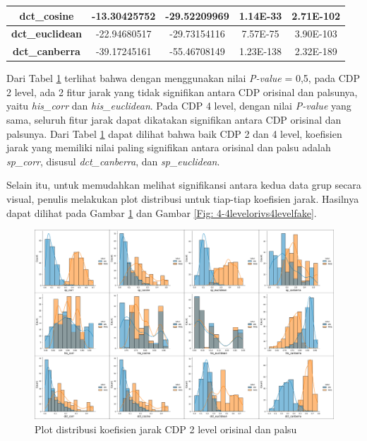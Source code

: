 \begin{table}[!ht]
\begin{tabular}{|c|cc|cc|}
		\textbf{dct\_cosine}    & \multicolumn{1}{c|}{-13.30425752}         & -29.52209969                          & \multicolumn{1}{c|}{1.14E-33}         & 2.71E-102        \\ \hline
		\textbf{dct\_euclidean} & \multicolumn{1}{c|}{-22.94680517}         & -29.73154116                          & \multicolumn{1}{c|}{7.57E-75}         & 3.90E-103        \\ \hline
		\textbf{dct\_canberra}  & \multicolumn{1}{c|}{-39.17245161}         & -55.46708149                          & \multicolumn{1}{c|}{1.23E-138}        & 2.32E-189        \\ \hline
	\end{tabular}
	\label{Tab: 4-hasilujisignifikansiorivspalsu}
\end{table}

Dari Tabel \ref{Tab: 4-hasilujisignifikansiorivspalsu} terlihat bahwa dengan menggunakan nilai \emph{P-value} =  0,5, pada CDP 2 level, ada 2 fitur jarak yang tidak signifikan antara CDP orisinal dan palsunya, yaitu \emph{his\_corr} dan \emph{his\_euclidean}. Pada CDP 4 level, dengan nilai \emph{P-value} yang sama, seluruh fitur jarak dapat dikatakan signifikan antara CDP orisinal dan palsunya. Dari Tabel \ref{Tab: 4-hasilujisignifikansiorivspalsu} dapat dilihat bahwa baik CDP 2 dan 4 level, koefisien jarak yang memiliki nilai paling signifikan antara orisinal dan palsu adalah \emph{sp\_corr}, disusul \emph{dct\_canberra}, dan \emph{sp\_euclidean}.

Selain itu, untuk memudahkan melihat signifikansi antara kedua data grup secara visual, penulis melakukan plot distribusi untuk tiap-tiap koefisien jarak.
Hasilnya dapat dilihat pada Gambar \ref{Fig: 4-2levelorivs2levelfake} dan Gambar \ref{Fig: 4-4levelorivs4levelfake}.

\begin{figure}[!h]
	\centering
	\includegraphics[width=\textwidth]{contents/chapter-4/4-2levelorivs2levelfake.png}
	\caption{Plot distribusi koefisien jarak CDP 2 level orisinal dan palsu}
	\label{Fig: 4-2levelorivs2levelfake}
\end{figure}

